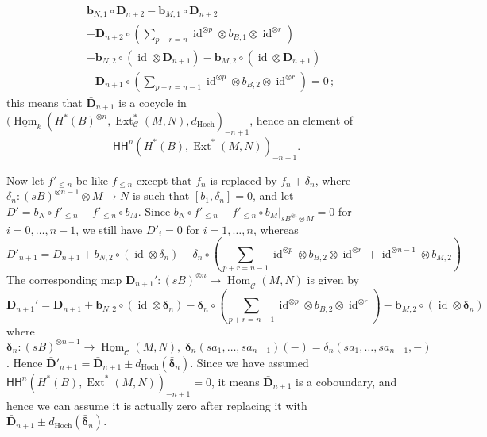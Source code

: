 \documentclass{amsart}
\numberwithin{equation}{section}
\let\cal\mathcal
\theoremstyle{definition}
\theoremstyle{remark}
\begin{document}
\begin{align*}
&\textbf{b}_{N,1}\circ \textbf{D}_{n+2} - \textbf{b}_{M,1}\circ \textbf{D}_{n+2} \\
&+\textbf{D}_{n+2}\circ \left( \sum_{p+r=n} {{\operatorname {id}}}^{\otimes p}\otimes b_{B,1}\otimes {{\operatorname {id}}}^{\otimes r}\right) \\
&+\textbf{b}_{N,2}\circ({{\operatorname {id}}}\otimes \textbf{D}_{n+1}) -\textbf{b}_{M,2}\circ ({{\operatorname {id}}}\otimes \textbf{D}_{n+1})   \\
&+\textbf{D}_{n+1}\circ \left( \sum_{p+r=n-1} {{\operatorname {id}}}^{\otimes p}\otimes b_{B,2}\otimes {{\operatorname {id}}}^{\otimes r} \right)=0\,;
\end{align*}
this means that $\bar{\textbf{D}}_{n+1}$ is a cocycle in $(\underline{\operatorname {Hom}}_k(H^*(B)^{\otimes n},{\operatorname {Ext}}^*_{{\cal C}}(M,N),d_{\mathrm{Hoch}})_{-n+1}$, hence an element of 
\[{\mathsf{HH}}^{n}(H^*(B),{\operatorname {Ext}}^*(M,N))_{-n+1}.\]

Now let $f'_{\leq n}$ be like $f_{\leq n}$ except that $f_n$ is
replaced by $f_n+\delta_n$, where $\delta_n:(sB)^{\otimes n-1}\otimes
M\to N$ is such that $[b_1,\delta_n]=0$, and let $D'=b_N\circ f'_{\leq
  n}-f'_{\leq n}\circ b_M$. Since $b_N\circ f'_{\leq n}-f'_{\leq
  n}\circ b_M|_{sB^{\otimes i}\otimes M}=0$ for $i=0,\ldots,n-1$, we still have
$D'_i=0$ for $i=1,\dots, n$, whereas
\[D'_{n+1}=D_{n+1}+b_{N,2}\circ({{\operatorname {id}}}\otimes \delta_n)-\delta_n\circ(\sum_{p+r=n-1} {{\operatorname {id}}}^{\otimes p}\otimes b_{B,2}\otimes {{\operatorname {id}}}^{\otimes r} +{{\operatorname {id}}}^{\otimes n-1}\otimes b_{M,2})\]
The corresponding map $\textbf{D}_{n+1}':(sB)^{\otimes n}{\rightarrow} \underline{\operatorname {Hom}}_{{\cal C}}(M, N)$ is given by
\[
\textbf{D}_{n+1}'=\textbf{D}_{n+1}+\textbf{b}_{N,2}\circ({{\operatorname {id}}}\otimes \boldsymbol\delta_n)-\boldsymbol\delta_n\circ (\sum_{p+r=n-1} {{\operatorname {id}}}^{\otimes p}\otimes b_{B,2}\otimes {{\operatorname {id}}}^{\otimes r}) -\textbf{b}_{M,2}\circ ({{\operatorname {id}}}\otimes \boldsymbol\delta_n)
\]
where $\boldsymbol\delta_{n}: (sB)^{\otimes n-1}\to
\underline{\operatorname {Hom}}_{{\cal C}}(M,N),\;
\boldsymbol\delta_{n}(sa_1,\ldots,sa_{n-1})(-)=\delta_{n}(sa_1,\ldots,sa_{n-1},-)$. Hence
$\bar{\textbf{D}}'_{n+1}= \bar{\textbf{D}}_{n+1}\pm
d_{\mathrm{Hoch}}(\bar{\boldsymbol\delta}_n)$. Since we have assumed
${\mathsf{HH}}^{n}(H^*(B),{\operatorname {Ext}}^*(M,N))_{-n+1}=0$, it means
$\bar{\textbf{D}}_{n+1}$ is a coboundary, and hence we can assume it
is actually zero after replacing it with $
\bar{\textbf{D}}_{n+1}\pm d_{\mathrm{Hoch}}(\bar{\boldsymbol\delta}_n)$.
\end{document}
